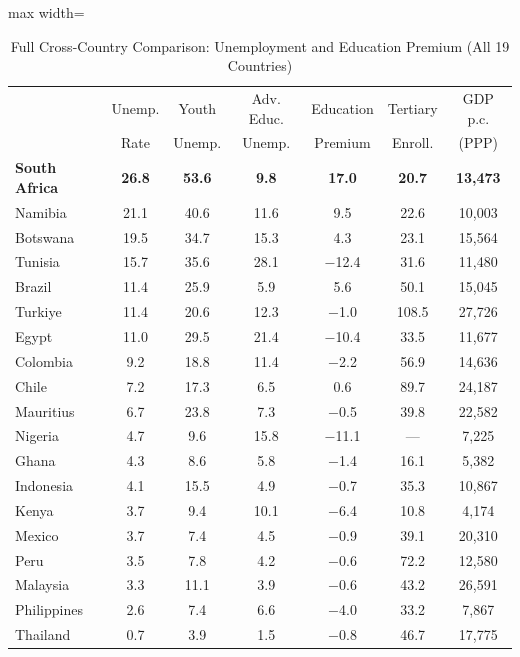 \documentclass[12pt]{article}
\begin{document}
\begin{table}[H]
\centering
\caption{Full Cross-Country Comparison: Unemployment and Education Premium (All 19 Countries)}
\label{tab:cross_country_full}
\begin{threeparttable}
\begin{adjustbox}{max width=\textwidth}
\begin{tabular}{lcccccc}
\toprule
 & Unemp. & Youth & Adv. Educ. & Education & Tertiary & GDP p.c. \\
 & Rate & Unemp. & Unemp. & Premium & Enroll. & (PPP) \\
\midrule
\textbf{South Africa} & \textbf{26.8} & \textbf{53.6} & \textbf{9.8} & \textbf{17.0} & \textbf{20.7} & \textbf{13,473} \\
Namibia & 21.1 & 40.6 & 11.6 & 9.5 & 22.6 & 10,003 \\
Botswana & 19.5 & 34.7 & 15.3 & 4.3 & 23.1 & 15,564 \\
Tunisia & 15.7 & 35.6 & 28.1 & $-$12.4 & 31.6 & 11,480 \\
Brazil & 11.4 & 25.9 & 5.9 & 5.6 & 50.1 & 15,045 \\
Turkiye & 11.4 & 20.6 & 12.3 & $-$1.0 & 108.5 & 27,726 \\
Egypt & 11.0 & 29.5 & 21.4 & $-$10.4 & 33.5 & 11,677 \\
Colombia & 9.2 & 18.8 & 11.4 & $-$2.2 & 56.9 & 14,636 \\
Chile & 7.2 & 17.3 & 6.5 & 0.6 & 89.7 & 24,187 \\
Mauritius & 6.7 & 23.8 & 7.3 & $-$0.5 & 39.8 & 22,582 \\
Nigeria & 4.7 & 9.6 & 15.8 & $-$11.1 & --- & 7,225 \\
Ghana & 4.3 & 8.6 & 5.8 & $-$1.4 & 16.1 & 5,382 \\
Indonesia & 4.1 & 15.5 & 4.9 & $-$0.7 & 35.3 & 10,867 \\
Kenya & 3.7 & 9.4 & 10.1 & $-$6.4 & 10.8 & 4,174 \\
Mexico & 3.7 & 7.4 & 4.5 & $-$0.9 & 39.1 & 20,310 \\
Peru & 3.5 & 7.8 & 4.2 & $-$0.6 & 72.2 & 12,580 \\
Malaysia & 3.3 & 11.1 & 3.9 & $-$0.6 & 43.2 & 26,591 \\
Philippines & 2.6 & 7.4 & 6.6 & $-$4.0 & 33.2 & 7,867 \\
Thailand & 0.7 & 3.9 & 1.5 & $-$0.8 & 46.7 & 17,775 \\
\bottomrule
\end{tabular}
\end{adjustbox}

\end{threeparttable}
\end{table}
\end{document}
